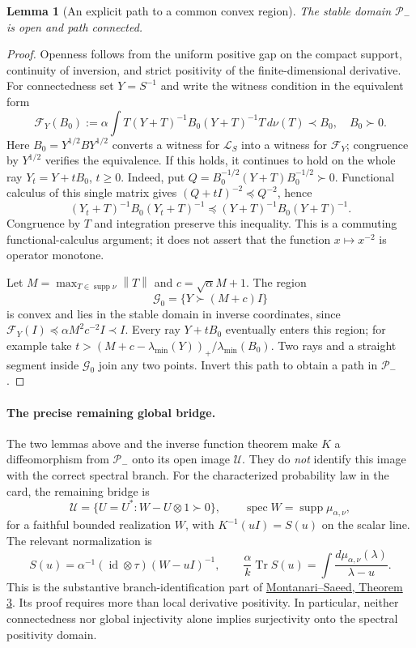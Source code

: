 \documentclass[11pt,a4paper]{article}
\newcommand{\norm}[1]{\left\lVert#1\right\rVert}
\newtheorem{lemma}[theorem]{Lemma}
\begin{document}
\begin{lemma}[An explicit path to a common convex region]
The stable domain \(\mathcal P_-\) is open and path connected.
\end{lemma}
\begin{proof}
Openness follows from the uniform positive gap on the compact support,
continuity of inversion, and strict positivity of the finite-dimensional
derivative.  For connectedness set \(Y=S^{-1}\) and write the witness
condition in the equivalent form
\[
 \mathcal F_Y(B_0):=
 \alpha\int T(Y+T)^{-1}B_0(Y+T)^{-1}T\,d\nu(T)\prec B_0,
 \quad B_0\succ0.
\]
Here $B_0=Y^{1/2}BY^{1/2}$ converts a witness for $\mathcal L_S$ into
a witness for $\mathcal F_Y$; congruence by $Y^{1/2}$ verifies the equivalence.
If this holds, it continues to hold on the whole ray \(Y_t=Y+tB_0\),
\(t\geq0\).  Indeed, put
\(Q=B_0^{-1/2}(Y+T)B_0^{-1/2}\succ0\).  Functional calculus of this single
matrix gives \((Q+tI)^{-2}\preceq Q^{-2}\), hence
\[
 (Y_t+T)^{-1}B_0(Y_t+T)^{-1}
 \preceq(Y+T)^{-1}B_0(Y+T)^{-1}.
\]
Congruence by \(T\) and integration preserve this inequality.  This is a
commuting functional-calculus argument; it does not assert that the
function \(x\mapsto x^{-2}\) is operator monotone.

Let \(M=\max_{T\in\operatorname{supp}\nu}\norm T\) and
\(c=\sqrt\alpha M+1\).  The region
\[
 \mathcal G_0=\{Y\succ(M+c)I\}
\]
is convex and lies in the stable domain in inverse coordinates, since
\(\mathcal F_Y(I)\preceq\alpha M^2c^{-2}I\prec I\).
Every ray \(Y+tB_0\) eventually enters this region; for example take
\(t>(M+c-\lambda_{\min}(Y))_+/\lambda_{\min}(B_0)\).
Two rays and a straight segment inside \(\mathcal G_0\) join any two points.
Invert this path to obtain a path in \(\mathcal P_-\).
\end{proof}

\paragraph{The precise remaining global bridge.}
The two lemmas above and the inverse function theorem make \(K\) a
diffeomorphism from \(\mathcal P_-\) onto its open image \(\mathcal U\).
They do \emph{not} identify this image with the correct spectral branch.
For the characterized probability law in the card, the remaining bridge is
\begin{equation}
 \mathcal U=\{U=U^*:W-U\otimes1\succ0\},\qquad
 \operatorname{spec}W=\operatorname{supp}\mu_{\alpha,\nu},
 \label{eq:wishart-global-bridge}
\end{equation}
for a faithful bounded realization \(W\), with
\(K^{-1}(uI)=S(u)\) on the scalar line.  The relevant normalization is
\[
 S(u)=\alpha^{-1}(\operatorname{id}\otimes\tau)
                (W-uI)^{-1},\qquad
 \frac\alpha k\operatorname{Tr}S(u)
       =\int\frac{d\mu_{\alpha,\nu}(\lambda)}{\lambda-u}.
\]
This is the substantive branch-identification part of
\href{https://arxiv.org/abs/2606.27774v1}{Montanari--Saeed, Theorem 3}.
Its proof requires more than local derivative positivity.  In particular,
neither connectedness nor global injectivity alone implies surjectivity
onto the spectral positivity domain.
\end{document}
